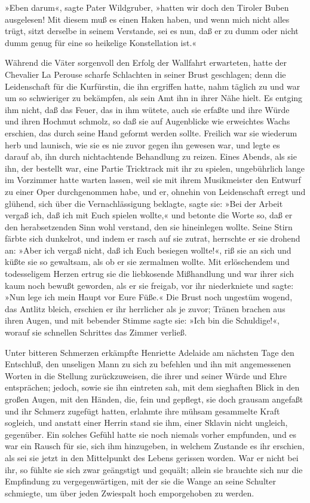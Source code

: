 \pagenum{[115]}»Eben darum«, sagte Pater Wildgruber, »hatten wir
doch den Tiroler Buben ausgelesen! Mit diesem muß es einen Haken
haben, und wenn mich nicht alles trügt, sitzt derselbe in seinem
Verstande, sei es nun, daß er zu dumm oder nicht dumm genug für
eine so heikelige Konstellation ist.«

Während die Väter sorgenvoll den Erfolg der Wallfahrt erwarteten,
hatte der Chevalier La Perouse scharfe Schlachten in seiner Brust
geschlagen; denn die Leidenschaft für die Kurfürstin, die ihn
ergriffen hatte, nahm täglich zu und war um so schwieriger zu
bekämpfen, als sein Amt ihn in ihrer Nähe hielt. Es entging ihm
nicht, daß das Feuer, das in ihm wütete, auch sie erfaßte und ihre
Würde und ihren Hochmut schmolz, so daß sie auf Augenblicke wie
erweichtes Wachs erschien, das durch seine Hand geformt werden
sollte. Freilich war sie wiederum herb und launisch, wie sie es nie
zuvor gegen ihn gewesen war, und legte es darauf ab, ihn durch
nichtachtende Behandlung zu reizen. Eines Abends, als sie ihn, der
bestellt war, eine Partie Tricktrack mit ihr zu spielen,
ungebührlich lange im Vorzimmer hatte warten lassen, weil sie mit
ihrem Musikmeister den Entwurf zu einer Oper durchgenommen habe,
und er, ohnehin von Leidenschaft erregt und glühend, sich über die
Vernachlässigung beklagte, sagte sie: »Bei der Arbeit vergaß ich,
daß ich mit Euch spielen wollte,« und betonte die Worte so, daß er
den herabsetzenden Sinn wohl verstand, den sie hineinlegen wollte.
Seine Stirn färbte sich dunkelrot, und indem er rasch auf sie
zutrat, herrschte er sie drohend an: »Aber ich vergaß nicht, daß
ich Euch besiegen wollte!«, riß sie an sich und küßte sie so
gewaltsam, als ob er sie zermalmen wollte. Mit erlöschendem und
todesseligem Herzen ertrug sie die liebkosende Mißhandlung und war
ihrer sich kaum noch\pagenum{[116]} bewußt geworden, als er sie
freigab, vor ihr niederkniete und sagte: »Nun lege ich mein Haupt
vor Eure Füße.« Die Brust noch ungestüm wogend, das Antlitz bleich,
erschien er ihr herrlicher als je zuvor; Tränen brachen aus ihren
Augen, und mit bebender Stimme sagte sie: »Ich bin die Schuldige!«,
worauf sie schnellen Schrittes das Zimmer verließ.

Unter bitteren Schmerzen erkämpfte Henriette Adelaide am nächsten
Tage den Entschluß, den unseligen Mann zu sich zu befehlen und ihn
mit angemessenen Worten in die Stellung zurückzuweisen, die ihrer
und seiner Würde und Ehre entsprächen; jedoch, sowie sie ihn
eintreten sah, mit dem sieghaften Blick in den großen Augen, mit
den Händen, die, fein und gepflegt, sie doch grausam angefaßt und
ihr Schmerz zugefügt hatten, erlahmte ihre mühsam gesammelte Kraft
sogleich, und anstatt einer Herrin stand sie ihm, einer Sklavin
nicht ungleich, gegenüber. Ein solches Gefühl hatte sie noch
niemals vorher empfunden, und es war ein Rausch für sie, sich ihm
hinzugeben, in welchem Zustande es ihr erschien, als sei sie jetzt
in den Mittelpunkt des Lebens gerissen worden. War er nicht bei
ihr, so fühlte sie sich zwar geängstigt und gequält; allein sie
brauchte sich nur die Empfindung zu vergegenwärtigen, mit der sie
die Wange an seine Schulter schmiegte, um über jeden Zwiespalt hoch
emporgehoben zu werden.

